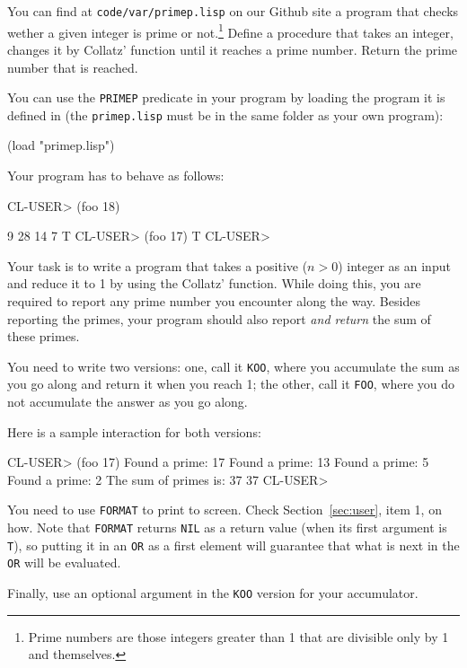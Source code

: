 \documentclass[a4paper,11pt]{article}
\begin{document}
\begin{uexercise}
You can find at \Verb+code/var/primep.lisp+ on our Github site a program that
checks wether a given integer is prime or not.\footnote{Prime numbers are those
integers greater than 1 that are divisible only by 1 and themselves.} Define a
procedure that takes an integer, changes it by Collatz' function until it
reaches a prime number. Return the prime number that is reached.

You can use the \Verb+PRIMEP+ predicate in your program by loading the program
it is defined in (the \Verb+primep.lisp+ must be in the same folder as your own
program):

\begin{lispcode}
(load "primep.lisp")
\end{lispcode}

Your program has to behave as follows:
\begin{lispcode}

CL-USER> (foo 18)

9 
28 
14 
7 
T
CL-USER> (foo 17)
T
CL-USER> 

\end{lispcode}
\end{uexercise}

\begin{uexercise}
Your task is to write a program that takes a positive ($n > 0$) integer as an
input and reduce it to 1 by using the Collatz' function. While doing this, you
are required to report any prime number you encounter along the way. Besides
reporting the primes, your program should also report \emph{and return} the sum
of these primes.

You need to write two versions: one, call it \Verb+KOO+, where you accumulate
the sum as you go along and return it when you reach 1; the other, call it \Verb+FOO+, where you do not
accumulate the answer as you go along.

Here is a sample interaction for both versions:

\begin{lispcode}
CL-USER> (foo 17)
Found a prime: 17
Found a prime: 13
Found a prime: 5
Found a prime: 2
The sum of primes is: 37
37
CL-USER>
\end{lispcode}

You need to use \Verb+FORMAT+ to print to screen. Check Section~\ref{sec:user},
item 1, on how. Note that \Verb+FORMAT+ returns \Verb+NIL+ as a return value
(when its first argument is \Verb+T+), so putting it in an \Verb+OR+ as a first
element will guarantee that what is next in the \Verb+OR+ will be evaluated.

Finally, use an optional argument in the \Verb+KOO+ version for your
accumulator.


\end{uexercise}
\end{document}
